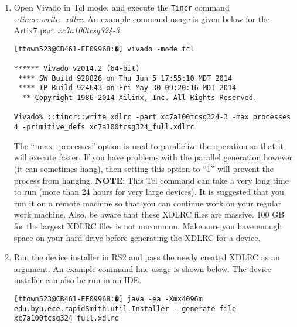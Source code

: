\begin {enumerate}
\item Open Vivado in Tcl mode, and execute the \texttt{Tincr} command
\textit{::tincr::write\_xdlrc}. An example command usage is given below for the
Artix7 part \textit{xc7a100tcsg324-3}.

\begin{lstlisting}[numbers=none]
[ttown523@CB461-EE09968:�] vivado -mode tcl

****** Vivado v2014.2 (64-bit)
 **** SW Build 928826 on Thu Jun 5 17:55:10 MDT 2014
 **** IP Build 924643 on Fri May 30 09:20:16 MDT 2014
  ** Copyright 1986-2014 Xilinx, Inc. All Rights Reserved.

Vivado% ::tincr::write_xdlrc -part xc7a100tcsg324-3 -max_processes 4 -primitive_defs xc7a100tcsg324_full.xdlrc
\end{lstlisting}

\noindent The ``-max\_processes'' option is used to parallelize the operation so
that it will execute faster. If you have problems with the parallel generation
however (it can sometimes hang), then setting this option to ``1'' will
prevent the process from hanging. \textbf{NOTE}: This Tcl command can take a
very long time to run (more than 24 hours for very large devices). It is
suggested that you run it on a remote machine so that you can continue work on
your regular work machine. Also, be aware that these XDLRC files are massive. 100 GB
for the largest XDLRC files is not uncommon. Make sure you have enough space on
your hard drive before generating the XDLRC for a device.

\item Run the device installer in RS2 and pass the newly created XDLRC
as an argument. An example command line usage is shown below. The device
installer can also be run in an IDE.

\begin{lstlisting}[numbers=none]
[ttown523@CB461-EE09968:�] java -ea -Xmx4096m edu.byu.ece.rapidSmith.util.Installer --generate file xc7a100tcsg324_full.xdlrc
\end{lstlisting} 


\end{enumerate}
